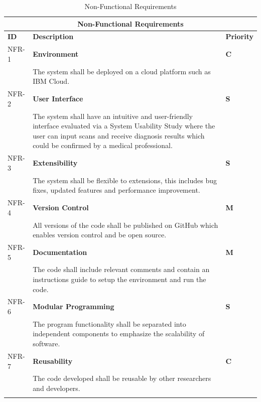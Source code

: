 \vspace{5em}
\begin{longtable}{| p{} | p{} | p{} |} 
  
  \hline
  \multicolumn{3}{|c|}{\textbf{Non-Functional Requirements}}\\
  \hline
  \textbf{ID} & \textbf{Description} & \textbf{Priority}  \\
  \hline
  NFR-1 & \textbf{Environment}  & \cellcolor{yellow}\textbf{C} \\ & The system shall be deployed on a cloud platform such as IBM Cloud. & \cellcolor{yellow} \\ \hline 
  NFR-2 & \textbf{User Interface}  & \cellcolor{cyan}\textbf{S} \\ &   The system shall have an intuitive and user-friendly interface evaluated via a System Usability Study where the user can input scans and receive diagnosis results which could be confirmed by a medical professional. & \cellcolor{cyan} \\ \hline 
  NFR-3 & \textbf{Extensibility}  & \cellcolor{cyan}\textbf{S} \\ & The system shall be flexible to extensions, this includes bug fixes, updated features and performance improvement.& \cellcolor{cyan} \\ \hline 
  NFR-4 & \textbf{Version Control}  & \cellcolor{green}\textbf{M} \\ & All versions of the code shall be published on GitHub which enables version control and be open source.& \cellcolor{green} \\ \hline 
  NFR-5 & \textbf{Documentation}  & \cellcolor{green}\textbf{M} \\ & The code shall include relevant comments and contain an instructions guide to setup the environment and run the code. & \cellcolor{green} \\ \hline 
  NFR-6 & \textbf{Modular Programming}  & \cellcolor{cyan}\textbf{S} \\ & The program functionality shall be separated into independent components to emphasize the scalability of software.& \cellcolor{cyan} \\ \hline 
  NFR-7 & \textbf{Reusability}  & \cellcolor{yellow}\textbf{C} \\ & The code developed shall be reusable by other researchers and developers. & \cellcolor{yellow} \\ \hline 

  \caption{Non-Functional Requirements}
  
    \label{tab:Non-Functional Requirements}
    \end{longtable}


